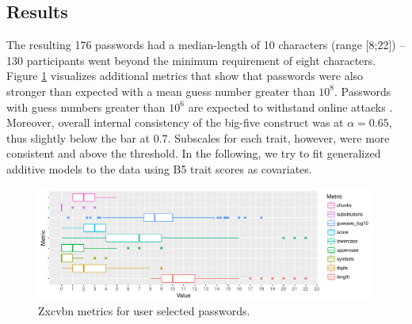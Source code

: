 \subsection{Results}
The resulting 176 passwords had a median-length of 10 characters (range [8;22]) -- 130 participants went beyond the minimum requirement of eight characters. Figure \ref{fig:personality:study3:metrics-overview} visualizes additional metrics that show that passwords were also stronger than expected with a mean guess number greater than $10^8$. Passwords with guess numbers greater than $10^6$ are expected to withstand online attacks \cite{Florencio2014AdministratorsGuide}. Moreover, overall internal consistency of the big-five construct was at $\alpha=0.65$, thus slightly below the bar at 0.7. Subscales for each trait, however, were more consistent and above the threshold. In the following, we try to fit generalized additive models to the data using B5 trait scores as covariates. 

\begin{figure}[tbph]
	\centering
	\includegraphics[width=1\linewidth]{figures/personality/study3-metrics-overview}
	\caption{\label{fig:personality:study3:metrics-overview} Zxcvbn metrics for user selected passwords.}
\end{figure}

